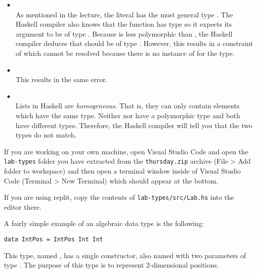 \begin{itemize}
\item {} \\
As mentioned in the lecture, the literal  has the most general type . The Haskell compiler also knows that the  function has type  so it expects its argument to be of type . Because  is less polymorphic than , the Haskell compiler deduces that  should be of type . However, this results in a constraint of  which cannot be resolved because there is no instance of  for the  type.
\item \haskellIn{[1,True,3]} \\
This results in the same error.
\item \haskellIn{['a', False]} \\
Lists in Haskell are \emph{homogeneous}. That is, they can only contain elements which have the same type. Neither  nor  have a polymorphic type and both have different types. Therefore, the Haskell compiler will tell you that the two types do not match.
\end{itemize}

\taskLine

If you are working on your own machine, open Visual Studio Code and open the \texttt{\small lab-types} folder you have extracted from the \texttt{thursday.zip} archive (File > Add folder to workspace) and then open a terminal window inside of Visual Studio Code (Terminal > New Terminal) which should appear at the bottom. 

If you are using replit, copy the contents of \texttt{\small lab-types/src/Lab.hs} into the editor there.

A fairly simple example of an algebraic data type is the following:
\begin{verbatim}
data IntPos = IntPos Int Int
\end{verbatim}
This type, named , has a single constructor, also named  with two parameters of type . The purpose of this type is to represent 2-dimensional positions.

